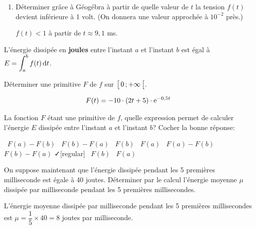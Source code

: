 \medskip


\begin{enumerate}[series=monDS, resume]
     
   \item Déterminer grâce à Géogébra à partir de quelle valeur de $t$ la tension $f(t)$ devient inférieure à 1 volt. (On donnera une valeur approchée à $10^{-2}$ près.)
    \begin{blocvisiblex}[height=1]
    {\quad}
    $f(t)<1$ à partir de $t\approx 9,1$ ms.
    \end{blocvisiblex}
\end{enumerate}

L'énergie dissipée en \textbf{joules} entre l'instant $a$ et l'instant $b$ est égal à $E=\displaystyle \int_{a}^{b} f(t) \,\mathrm{d}t$.

\begin{enumerate}[series=monDS, resume]
    \begin{minipage}{0.46\textwidth}
            \item Déterminer une primitive $F$ de $f$ sur $\bigl[ \, 0 \, ; +\infty \,\bigl[$.
    \end{minipage}\hfill{}
    \begin{minipage}{0.46\textwidth}
        \begin{blocvisiblex}[height=1.2]
    {\quad}

    \[F(t)=-10\cdot (2t+5)\cdot \mathrm{e}^{-0,5t}\]
    \end{blocvisiblex}
    \end{minipage}
    
    \medskip

    \item La fonction $F$ étant une primitive de $f$, quelle expression permet de calculer l'énergie $E$ dissipée entre l'instant $a$ et l'instant $b$? Cocher la bonne réponse:
   \begin{blocvisiblex}[height=1]
    {
    \faSquare[regular] \, $F(a) - F(b)$ \hfill \faSquare[regular] \, $F(b) - F(a)$ \hfill \faSquare[regular] \, $F(b)$ \hfill \faSquare[regular] \, $F(a)$ \hspace{1cm} 
 }         
    \faSquare[regular] \, $F(a) - F(b)$ \hfill \faSquare[regular] \, $F(b) - F(a)$ \hfill \faCheck[regular] \, $F(b)$ \hfill \faSquare[regular] \, $F(a)$ \hspace{1cm} 
    \end{blocvisiblex}
    \medskip
\item On suppose maintenant que l'énergie dissipée pendant les 5 premières milliseconde est égale à 40 joutes. Déterminer par le calcul l'énergie moyenne $\mu$ dissipée par milliseconde pendant les 5 premières millisecondes.
    \begin{blocvisiblex}[height=3]
    {\quad}
    L'énergie moyenne dissipée par milliseconde pendant les 5 premières millisecondes est $\mu=\dfrac{1}{5} \times 40=8$ joutes par milliseconde.
    \end{blocvisiblex}
    \medskip
    
\end{enumerate}
    


